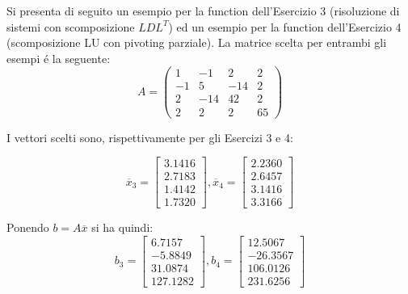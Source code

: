 \begin{center}
\footnotesize\noindent{}\end{center}

\noindent Si presenta di seguito un esempio per la function dell'Esercizio 3 (risoluzione di sistemi con scomposizione \(LDL^T\)) ed un esempio per la function dell'Esercizio 4 (scomposizione LU con pivoting parziale). La matrice scelta per entrambi gli esempi \'e la seguente:
\[
A = \begin{pmatrix} 1 & -1 & 2 & 2 \\ -1 & 5 & -14 & 2\\ 2 & -14 & 42 & 2\\ 2 & 2 & 2 & 65 \end{pmatrix}
\]

\noindent I vettori scelti sono, rispettivamente per gli Esercizi 3 e 4:

\[
\overline{x}_3 = \begin{bmatrix} 3.1416 \\ 2.7183 \\ 1.4142 \\ 1.7320 \end{bmatrix},
\overline{x}_4 = \begin{bmatrix} 2.2360 \\ 2.6457 \\ 3.1416 \\ 3.3166 \end{bmatrix}
\]

\noindent Ponendo \(b=A\overline{x}\) si ha quindi:
\\
\[
b_3 = \begin{bmatrix} 6.7157 \\ -5.8849 \\ 31.0874 \\ 127.1282 \end{bmatrix},
b_4 = \begin{bmatrix} 12.5067 \\ -26.3567 \\ 106.0126 \\ 231.6256 \end{bmatrix}
\]

